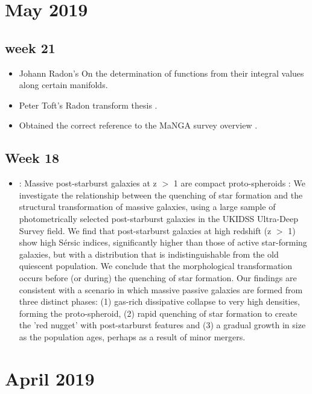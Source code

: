 \documentclass[ceqn,usenatbib,onecolumn]{mnras}
\begin{document}
\section{May 2019}
\subsection{week 21}
\begin{itemize}
    \item Johann Radon's \citep{radon1917determination} On the determination of functions from their integral values along certain manifolds.
    \item Peter Toft's Radon transform thesis \citep{7910dc8d5b654c90ac4bc94c67d06f01}.
    \item Obtained the correct reference to the MaNGA survey overview \citep{2015ApJ...798....7B}.
\end{itemize}


\subsection{Week 18}
\begin{itemize}
    \item \citet{2017MNRAS.472.1401A} : {Massive post-starburst galaxies at z $>$ 1 are compact proto-spheroids} : We investigate the relationship between the quenching of star formation and the structural transformation of massive galaxies, using a large sample of photometrically selected post-starburst galaxies in the UKIDSS Ultra-Deep Survey field. We find that post-starburst galaxies at high redshift (z $>$ 1) show high Sérsic indices, significantly higher than those of active star-forming galaxies, but with a distribution that is indistinguishable from the old quiescent population. We conclude that the morphological transformation occurs before (or during) the quenching of star formation.  Our findings are consistent with a scenario in which massive passive galaxies are formed from three distinct phases: (1) gas-rich dissipative collapse to very high densities, forming the proto-spheroid, (2) rapid quenching of star formation to create the 'red nugget' with post-starburst features and (3) a gradual growth in size as the population ages, perhaps as a result of minor mergers.
\end{itemize}

\section{April 2019}
\end{document}
